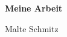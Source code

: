 \documentclass{scrartcl}
\begin{document}
  \pagestyle{empty}
  \begin{titlepage}
    \begin{center}
      \textsf{\textbf{\Huge Meine Arbeit}}
  
      \Large Malte Schmitz
    \end{center}
  \end{titlepage}
\end{document}
